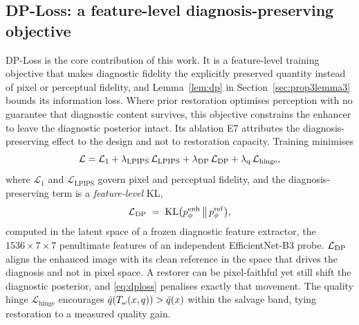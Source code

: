 \subsection{DP-Loss: a feature-level diagnosis-preserving objective}\label{sec:dploss}
DP-Loss is the core contribution of this work. It is a feature-level training objective
that makes diagnostic fidelity the explicitly preserved quantity instead of pixel or perceptual
fidelity, and Lemma~\ref{lem:dp} in Section~\ref{sec:prop3lemma3} bounds its information loss.
Where prior restoration optimises perception with no guarantee that diagnostic content survives,
this objective constrains the enhancer to leave the diagnostic posterior intact. Its ablation E7
attributes the diagnosis-preserving effect to the design and not to restoration capacity. Training
minimises
\begin{equation}
\mathcal{L}=\mathcal{L}_1
  +\lambda_{\mathrm{LPIPS}}\,\mathcal{L}_{\mathrm{LPIPS}}
  +\lambda_{\mathrm{DP}}\,\mathcal{L}_{\mathrm{DP}}
  +\lambda_{\mathrm{q}}\,\mathcal{L}_{\mathrm{hinge}},
\label{eq:total-loss}
\end{equation}
where $\mathcal{L}_1$ and $\mathcal{L}_{\mathrm{LPIPS}}$ govern pixel and perceptual fidelity, and the
diagnosis-preserving term is a \emph{feature-level} KL,
\begin{equation}
\mathcal{L}_{\mathrm{DP}} \;=\; \operatorname{KL}\!\big(p_\phi^{\mathrm{enh}} \,\big\|\, p_\phi^{\mathrm{ref}}\big),
\label{eq:dploss}
\end{equation}
computed in the latent space of a frozen diagnostic feature extractor, the $1536\times7\times7$
penultimate features of an independent EfficientNet-B3 probe. $\mathcal{L}_{\mathrm{DP}}$ aligns the enhanced image with
its clean reference in the space that drives the diagnosis and not in pixel space. A restorer can be
pixel-faithful yet still shift the diagnostic posterior, and \eqref{eq:dploss} penalises exactly that
movement. The quality hinge $\mathcal{L}_{\mathrm{hinge}}$ encourages $\bar{q}(T_\omega(x,q))>\bar{q}(x)$ within
the salvage band, tying restoration to a measured quality gain.

